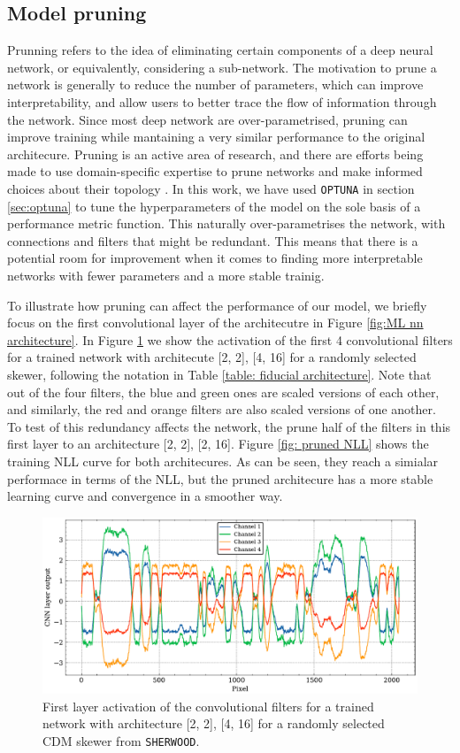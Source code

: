 \subsection{Model pruning}
Prunning refers to the idea of eliminating certain components of a deep neural network, or equivalently, considering a sub-network. The motivation to prune a network is generally to reduce the number of parameters, which can improve interpretability, and allow users to better trace the flow of information through the network. Since most deep network are over-parametrised, pruning can improve training while mantaining a very similar performance to the original architecure. Pruning is an active area of research, and there are efforts being made to use domain-specific expertise to prune networks and make informed choices about their topology \cite{pruning}. In this work, we have used \texttt{OPTUNA} in section \ref{sec:optuna} to tune the hyperparameters of the model on the sole basis of a performance metric function. This naturally over-parametrises the network, with connections and filters that might be redundant. This means that there is a potential room for improvement when it comes to finding more interpretable networks with fewer parameters and a more stable trainig.

To illustrate how pruning can affect the performance of our model, we briefly focus on the first convolutional layer of the architecutre in Figure \ref{fig:ML nn architecture}. In Figure \ref{fig: filter acti} we show the activation of the first 4 convolutional filters for a trained network with architecute [2, 2], [4, 16] for a randomly selected skewer, following the notation in Table \ref{table: fiducial architecture}. Note that out of the four filters, the blue and green ones are scaled versions of each other, and similarly, the red and orange filters are also scaled versions of one another. To test of this redundancy affects the network, the prune half of the filters in this first layer to an architecture [2, 2], [2, 16]. Figure \ref{fig: pruned NLL} shows the training NLL curve for both architecures. As can be seen, they reach a simialar performace in terms of the NLL, but the pruned architecure has a more stable learning curve and convergence in a smoother way.


\begin{figure}
    \centering
    \includegraphics[width=0.9\linewidth]{img/ML/filter-acti.pdf}
    \caption{First layer activation of the convolutional filters for a trained network with architecture [2, 2], [4, 16] for a randomly selected CDM skewer from \texttt{SHERWOOD}.}
    \label{fig: filter acti}
\end{figure}


